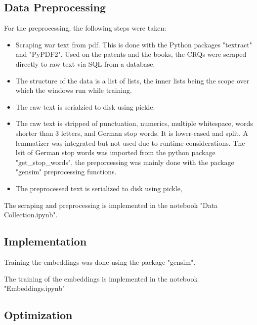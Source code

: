 \documentclass[10pt,a4paper]{article}
\begin{document}
	\subsection{Data Preprocessing}
	For the preprocessing, the following steps were taken:
	\begin{itemize}
		\item Scraping war text from pdf. This is done with the Python packages "textract" and "PyPDF2". Used on the patents and the books, the CRQs were scraped directly to raw text via SQL from a database.
		\item The structure of the data is a list of lists, the inner lists being the scope over which the windows run while training.
		\item The raw text is serialzied to disk using pickle.
		\item The raw text is stripped of punctuation, numerics, multiple whitespace, words shorter than 3 letters, and German stop words. It is lower-cased and split. A lemmatizer was integrated but not used due to runtime considerations. The lsit of German stop words was imported from the python package "get\_stop\_words", the preporcessing was mainly done with the package "gensim" preprocessing functions.
		\item The preprocessed text is serialized to disk using pickle,
	\end{itemize}
    The scraping and preprocessing is implemented in the notebook "Data Collection.ipynb". 
    
	\subsection{Implementation}
	Training the embeddings was done using the package "gensim". 
	
	The training of the embeddings is implemented in the notebook "Embeddings.ipynb"
	
	\subsection{Optimization}
	
\end{document}
